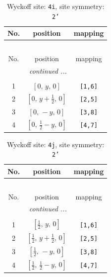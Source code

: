 \documentclass[fleqn,8pt]{jsarticle}
\begin{document}
\begin{longtable}{ccc}
\caption{Wyckoff site: {\tt 4i}, site symmetry: {\tt 2'}}
 \\
 \hline \hline
No. & position & mapping \\ \hline \endfirsthead

\multicolumn{2}{l}{\tablename\ \thetable{}} \\
 \hline \hline
No. & position & mapping \\ \hline \endhead

 \hline \hline
\multicolumn{2}{r}{\footnotesize\it continued ...} \\ \endfoot

 \hline \hline
\multicolumn{2}{r}{} \\ \endlastfoot

1 & $\left[ 0,\, y,\, 0 \right]$ & {\tt [1,6]} \\ \hline
2 & $\left[ 0,\, y + \frac{1}{2},\, 0 \right]$ & {\tt [2,5]} \\ \hline
3 & $\left[ 0,\, - y,\, 0 \right]$ & {\tt [3,8]} \\ \hline
4 & $\left[ 0,\, \frac{1}{2} - y,\, 0 \right]$ & {\tt [4,7]} \\
\end{longtable}
\renewcommand{\arraystretch}{1.2}
\begin{longtable}{ccc}
\caption{Wyckoff site: {\tt 4j}, site symmetry: {\tt 2'}}
 \\
 \hline \hline
No. & position & mapping \\ \hline \endfirsthead

\multicolumn{2}{l}{\tablename\ \thetable{}} \\
 \hline \hline
No. & position & mapping \\ \hline \endhead

 \hline \hline
\multicolumn{2}{r}{\footnotesize\it continued ...} \\ \endfoot

 \hline \hline
\multicolumn{2}{r}{} \\ \endlastfoot

1 & $\left[ \frac{1}{2},\, y,\, 0 \right]$ & {\tt [1,6]} \\ \hline
2 & $\left[ \frac{1}{2},\, y + \frac{1}{2},\, 0 \right]$ & {\tt [2,5]} \\ \hline
3 & $\left[ \frac{1}{2},\, - y,\, 0 \right]$ & {\tt [3,8]} \\ \hline
4 & $\left[ \frac{1}{2},\, \frac{1}{2} - y,\, 0 \right]$ & {\tt [4,7]} \\
\end{longtable}
\end{document}

